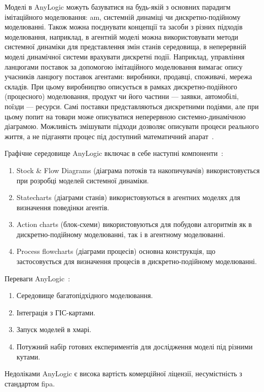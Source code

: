 Моделі в AnyLogic можуть базуватися на будь-якій з основних парадигм імітаційного моделювання: \acrshort{am}, системній динаміці чи дискретно-подійному моделюванні. 
Також можна поєднувати концепції та засоби з різних підходів моделювання, наприклад, в агентній моделі можна використовувати методи системної динаміки для представлення змін станів середовища, в неперервній моделі динамічної системи врахувати дискретні події.
Наприклад, управління ланцюгами поставок за допомогою імітаційного моделювання вимагає опису учасників ланцюгу поставок агентами: виробники, продавці, споживачі, мережа складів. 
При цьому виробництво описується в рамках дискретно-подійного (процесного) моделювання, продукт чи його частини --- заявки, автомобілі, поїзди --- ресурси. 
Самі поставки представляються дискретними подіями, але при цьому попит на товари може описуватися неперервною системно-динамічною діаграмою. 
Можливість змішувати підходи дозволяє описувати процеси реального життя, а не підганяти процес під доступний математичний апарат~\cite{anylogic,Kravari2015}.

Графічне середовище AnyLogic включає в себе наступні компоненти~\cite{anylogic}:
\begin{enumerate}
\item Stock \& Flow Diagrams (діаграма потоків та накопичувачів) використовується при розробці моделей системної динаміки.
\item Statecharts (діаграми станів) використовуються в агентних моделях для визначення поведінки агентів.
\item Action charts (блок-схеми) використовуються для побудови алгоритмів як в дискретно-подійному моделюванні, так і в агентному моделюванні.
\item Process flowcharts (діаграми процесів) основна конструкція, що застосовується для визначення процесів в дискретно-подійному моделюванні.
\end{enumerate}

Переваги AnyLogic~\cite{anylogic}:
\begin{enumerate}
	\item Середовище багатопідхідного моделювання.
	\item Інтеграція з ГІС-картами.
	\item Запуск моделей в хмарі.
	\item Потужний набір готових експериментів для дослідження моделі під різними кутами.
\end{enumerate}

Недоліками AnyLogic є висока вартість комерційної ліцензії, несумістність з стандартом \acrshort{fipa}.

